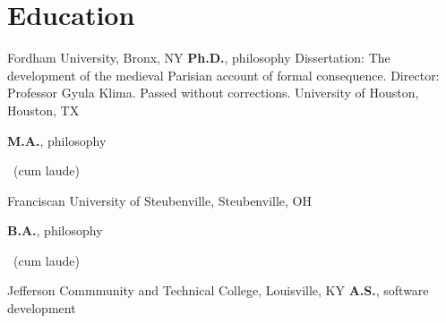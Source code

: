 \vspace*{0.4cm}
\section{Education}
	{%
		Fordham University, Bronx, NY}
	{%
		\textbf{Ph.D.}, philosophy}
	{%
	Dissertation: The development of the medieval Parisian account of formal consequence. Director: Professor Gyula Klima. Passed without corrections.}
		{%
			University of Houston, Houston, TX}
		{%
			\textbf{M.A.}, philosophy\begin{footnotesize}
				~(cum laude)
			\end{footnotesize}}
		{}
{%
	Franciscan University of Steubenville, Steubenville, OH}
{%
	\textbf{B.A.}, philosophy\begin{footnotesize}
		~(cum laude)
\end{footnotesize}}
{}
{%
	Jefferson Commmunity and Technical College, Louisville, KY}
{%
	\textbf{A.S.}, software development}
{}